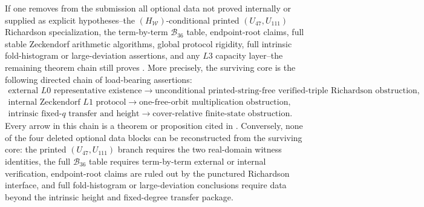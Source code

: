\begin{proposition}
\label{thm:verified-core-hierarchy-projection}
If one removes from the submission all optional data not proved internally or supplied as
explicit hypotheses--the \((H_{\mathcal W})\)-conditional printed
\((U_{47},U_{111})\) Richardson specialization,
the term-by-term \(\mathcal B_{36}\) table, endpoint-root claims, full stable
Zeckendorf arithmetic algorithms, global protocol rigidity, full intrinsic
fold-histogram or large-deviation assertions, and any \(L3\) capacity layer--the
remaining theorem chain still proves .  More precisely, the surviving core
is the following directed chain of load-bearing assertions:
\[
\begin{gathered}
\text{external }L0\text{ representative existence}
\longrightarrow
  \text{unconditional printed-string-free verified-triple Richardson obstruction},\\
\text{internal Zeckendorf }L1\text{ protocol}
\longrightarrow
\text{one-free-orbit multiplication obstruction},\\
\text{intrinsic fixed-}q\text{ transfer and height}
\longrightarrow
\text{cover-relative finite-state obstruction}.
\end{gathered}
\]
Every arrow in this chain is a theorem or proposition cited in
.  Conversely, none of the four
deleted optional data blocks can be reconstructed from the surviving core: the
printed \((U_{47},U_{111})\) branch requires the two real-domain witness
identities, the full \(\mathcal B_{36}\) table requires term-by-term external or
internal verification, endpoint-root claims are ruled out by the punctured
Richardson interface, and full fold-histogram or large-deviation conclusions
require data beyond the intrinsic height and fixed-degree transfer package.
\end{proposition}

